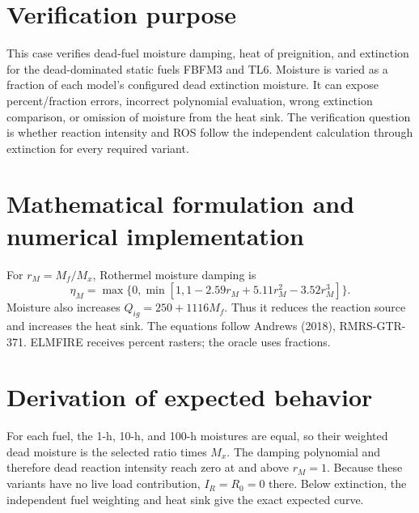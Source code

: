 \section{Verification purpose}
This case verifies dead-fuel moisture damping, heat of preignition, and extinction for the dead-dominated static fuels FBFM3 and TL6.  Moisture is varied as a fraction of each model's configured dead extinction moisture.  It can expose percent/fraction errors, incorrect polynomial evaluation, wrong extinction comparison, or omission of moisture from the heat sink.  The verification question is whether reaction intensity and ROS follow the independent calculation through extinction for every required variant.

\section{Mathematical formulation and numerical implementation}
For $r_M=M_f/M_x$, Rothermel moisture damping is
\begin{equation}\eta_M=\max\{0,\min[1,1-2.59r_M+5.11r_M^2-3.52r_M^3]\}.\end{equation}
Moisture also increases $Q_{ig}=250+1116M_f$.  Thus it reduces the reaction source and increases the heat sink.  The equations follow Andrews (2018), RMRS-GTR-371.  ELMFIRE receives percent rasters; the oracle uses fractions.

\section{Derivation of expected behavior}
For each fuel, the 1-h, 10-h, and 100-h moistures are equal, so their weighted dead moisture is the selected ratio times $M_x$.  The damping polynomial and therefore dead reaction intensity reach zero at and above $r_M=1$.  Because these variants have no live load contribution, $I_R=R_0=0$ there.  Below extinction, the independent fuel weighting and heat sink give the exact expected curve.

